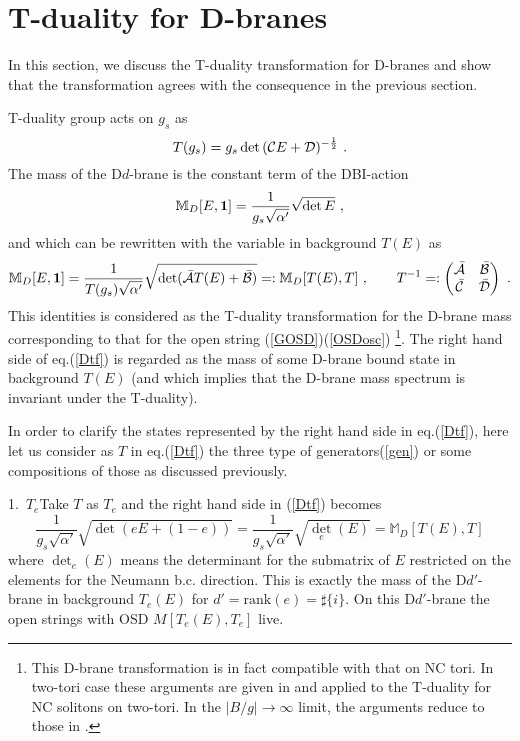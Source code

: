 \documentclass[a4paper,12pt]{article}
\newcommand{\M}{{\mathbb{M}}}
\newcommand{\bp}{\begin{pmatrix}}
\newcommand{\ep}{\end{pmatrix}}
\def \cC{{\cal C}}
\def \cD{{\cal D}}
\def \cAb{{\bar {\cal A}}}
\def \cBb{{\bar {\cal B}}}
\def \cCb{{\bar {\cal C}}}
\def \cDb{{\bar {\cal D}}}
\def \raw{\rightarrow}
\def \rank{\mathrm{rank}}
\def \half{\frac{1}{2}}
\def \ov#1{\frac{1}{#1}}
\begin{document}
 \section{T-duality for D-branes}
\label{sec:3}

In this section, we discuss the T-duality transformation for D-branes 
and show that the transformation agrees with 
the consequence in the previous section. 

T-duality group acts on $g_s$ as 
\begin{equation*}
  T(g_s)=g_s\det{(\cC E+\cD)^{-\half}}\ .
\end{equation*}
The mass of the D$d$-brane is the constant term of the DBI-action 
\begin{equation*}
 \M_{D}[E,{\bf 1}]=\ov{g_s\sqrt{\alpha'}}\sqrt{\det E}\ , 
\end{equation*}
and which can be rewritten with the variable in background $T(E)$ as 
\begin{equation}
 \M_{D}[E,{\bf 1}]=\ov{T(g_s)\sqrt{\alpha'}}\sqrt{\det (\cAb T(E)+\cBb)}
 =:\M_{D}[T(E), T]
 \ ,\qquad T^{-1}=:\bp \cAb &\cBb \\ \cCb &\cDb \ep\ .
 \label{Dtf}
\end{equation}
This identities is considered as the T-duality transformation for the 
D-brane mass corresponding to that for the open string 
(\ref{GOSD})(\ref{OSDosc})
\footnote{This D-brane transformation is in fact compatible with that 
on NC tori. 
In two-tori case these arguments are given in \cite{KMT} and applied to 
the T-duality for NC solitons on two-tori. 
In the $|B/g|\raw\infty$ limit, the arguments reduce to those 
in \cite{BKMT}.}. 
The right hand side of eq.(\ref{Dtf}) 
is regarded as the mass of some D-brane bound state in background $T(E)$ 
(and which implies that the D-brane mass spectrum is invariant 
under the T-duality). 

In order to clarify the states represented by the 
right hand side in eq.(\ref{Dtf}), 
here let us consider as $T$ in eq.(\ref{Dtf}) the three type 
of generators(\ref{gen}) or some compositions of those 
as discussed previously. 

\vspace*{0.3cm}

1.\ $T_e$\quad Take $T$ as $T_e$ and 
the right hand side in (\ref{Dtf}) becomes
\begin{equation}
 \ov{g_s\sqrt{\alpha'}}\sqrt{\det (e E+(1-e))}
 =\ov{g_s\sqrt{\alpha'}}\sqrt{{\det}_e(E)}=\M_{D}[T(E),T] \label{DTe}
\end{equation}
where $\det_e (E)$ means the determinant for the submatrix of $E$ 
restricted on the elements for the Neumann b.c. direction.
This is exactly the mass of the D$d'$-brane in background $T_e(E)$ 
for $d'=\rank (e)=\sharp \{i\}$. 
On this D$d'$-brane the open strings with OSD $M[T_e(E),T_e]$ live. 
\end{document}
